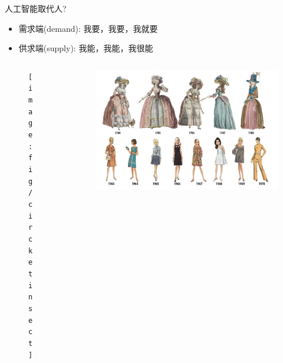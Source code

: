 \documentclass[handout]{beamer}
\begin{document}
\begin{frame}{人工智能取代人?}
	\begin{itemize}
		\item 需求端(demand): 我要，我要，我就要 
		\item 供求端(supply): 我能，我能，我很能 
	\end{itemize}
\begin{columns}
	\begin{column}{0.5\textwidth}
		\begin{figure}[H]
			\centering
			\texttt{[image: fig/circketinsect]}
		\end{figure}
	\end{column}
	\begin{column}{0.5\textwidth}
			\begin{figure}[H]
		\centering
		\includegraphics[width=\textwidth]{fig/fashionevolv}
	\end{figure}
	\end{column}
\end{columns}
\end{frame}
\end{document}
